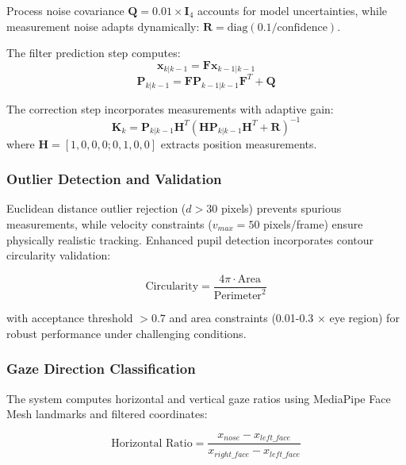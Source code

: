 \documentclass[conference]{IEEEtran}
\begin{document}
Process noise covariance $\mathbf{Q} = 0.01 \times \mathbf{I}_4$ accounts for model 
uncertainties, while measurement noise adapts dynamically: 
$\mathbf{R} = \text{diag}(0.1/\text{confidence})$. 

The filter prediction step computes:
\begin{equation}
\mathbf{x}_{k|k-1} = \mathbf{F}\mathbf{x}_{k-1|k-1}
\end{equation}
\begin{equation}
\mathbf{P}_{k|k-1} = \mathbf{F}\mathbf{P}_{k-1|k-1}\mathbf{F}^T + \mathbf{Q}
\end{equation}

The correction step incorporates measurements with adaptive gain:
\begin{equation}
\mathbf{K}_k = \mathbf{P}_{k|k-1}\mathbf{H}^T(\mathbf{H}\mathbf{P}_{k|k-1}\mathbf{H}^T + \mathbf{R})^{-1}
\end{equation}
where $\mathbf{H} = [1, 0, 0, 0; 0, 1, 0, 0]$ extracts position measurements.

\subsubsection{Outlier Detection and Validation}

Euclidean distance outlier rejection ($d > 30$ pixels) prevents spurious measurements, 
while velocity constraints ($v_{max} = 50$ pixels/frame) ensure physically realistic 
tracking. Enhanced pupil detection incorporates contour circularity validation:

\begin{equation}
\text{Circularity} = \frac{4\pi \cdot \text{Area}}{\text{Perimeter}^2}
\end{equation}

with acceptance threshold $> 0.7$ and area constraints (0.01-0.3 × eye region) for 
robust performance under challenging conditions\cite{akinyelu2021cnn}.

\subsubsection{Gaze Direction Classification}

The system computes horizontal and vertical gaze ratios using MediaPipe Face Mesh 
landmarks and filtered coordinates:

\begin{equation}
\text{Horizontal Ratio} = \frac{x_{nose} - x_{left\_face}}{x_{right\_face} - x_{left\_face}}
\end{equation}
\end{document}
